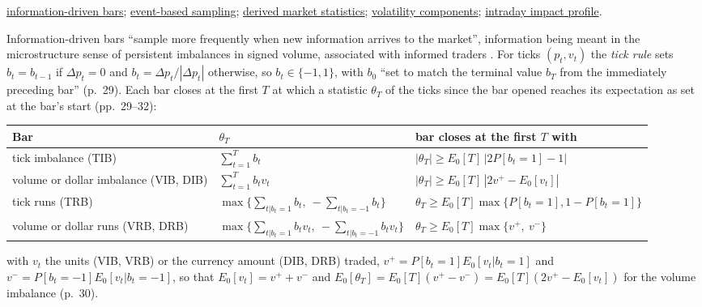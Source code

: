 \begin{qfmethod}
 \hyperref[meth:information-driven-bars]{information-driven bars}; \hyperref[meth:event-based-sampling]{event-based sampling}; \hyperref[data:derived-market-statistics]{derived market statistics}; \hyperref[def:volatility-components]{volatility components}; \hyperref[ev:intraday-impact-profile]{intraday impact profile}.

\end{qfmethod}

\begin{qfmethod}\label{meth:information-driven-bars}
 Information-driven bars ``sample more frequently when new information arrives to the market'', information being meant in the microstructure sense of persistent imbalances in signed volume, associated with informed traders \citep[chap.~2, sec.~2.3.2, p.~29]{alpha-afml}. For ticks $(p_t,v_t)$ the \emph{tick rule} sets $b_t=b_{t-1}$ if $\Delta p_t=0$ and $b_t=\Delta p_t/|\Delta p_t|$ otherwise, so $b_t\in\{-1,1\}$, with $b_0$ ``set to match the terminal value $b_T$ from the immediately preceding bar'' (p.~29). Each bar closes at the first $T$ at which a statistic $\theta_T$ of the ticks since the bar opened reaches its expectation as set at the bar's start (pp.~29--32):
\begin{center}\footnotesize
\begin{tabular}{@{}lll@{}}
\toprule
Bar & $\theta_T$ & bar closes at the first $T$ with \\
\midrule
tick imbalance (TIB) & $\sum_{t=1}^Tb_t$ & $|\theta_T|\ge E_0[T]\,|2P[b_t=1]-1|$ \\
volume or dollar imbalance (VIB, DIB) & $\sum_{t=1}^Tb_tv_t$ & $|\theta_T|\ge E_0[T]\,|2v^+-E_0[v_t]|$ \\
tick runs (TRB) & $\max\{\sum_{t|b_t=1}b_t,\ -\sum_{t|b_t=-1}b_t\}$ & $\theta_T\ge E_0[T]\max\{P[b_t=1],1-P[b_t=1]\}$ \\
volume or dollar runs (VRB, DRB) & $\max\{\sum_{t|b_t=1}b_tv_t,\ -\sum_{t|b_t=-1}b_tv_t\}$ & $\theta_T\ge E_0[T]\max\{v^+,\ v^-\}$ \\
\bottomrule
\end{tabular}
\end{center}
with $v_t$ the units (VIB, VRB) or the currency amount (DIB, DRB) traded, $v^+=P[b_t=1]E_0[v_t|b_t=1]$ and $v^-=P[b_t=-1]E_0[v_t|b_t=-1]$, so that $E_0[v_t]=v^++v^-$ and $E_0[\theta_T]=E_0[T](v^+-v^-)=E_0[T](2v^+-E_0[v_t])$ for the volume imbalance (p.~30).


\end{qfmethod}
